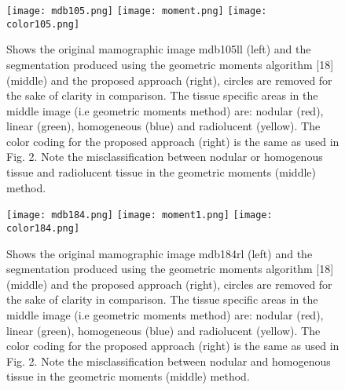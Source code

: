 \documentclass{article}
\begin{document}
\begin{figure}[!htb]
	\centering
	\texttt{[image: mdb105.png]}\hfil
	\texttt{[image: moment.png]}\hfil
	\texttt{[image: color105.png]}
	\caption{Shows the original mamographic image mdb105ll (left) and the segmentation produced using the geometric moments algorithm [18](middle) and the proposed approach (right), circles are removed for the sake of clarity in comparison. The tissue specific areas in the middle image (i.e geometric moments method) are: nodular (red), linear (green), homogeneous (blue) and radiolucent (yellow). The color coding for the proposed approach (right) is the same as used in Fig. 2. Note the misclassification between nodular or homogenous tissue and radiolucent tissue in the geometric moments (middle) method. } 
	
\end{figure}
\newpage
\begin{figure}[h!b]
	\centering
	\texttt{[image: mdb184.png]}\hfil
	\texttt{[image: moment1.png]}\hfil
	\texttt{[image: color184.png]}
	\caption{Shows the original mamographic image mdb184rl (left) and the segmentation produced using the geometric moments algorithm [18](middle) and the proposed approach (right), circles are removed for the sake of clarity in comparison. The tissue specific areas in the middle image (i.e geometric moments method) are: nodular (red), linear (green), homogeneous (blue) and radiolucent (yellow). The color coding for the proposed approach (right) is the same as used in Fig. 2. Note the misclassification between nodular and homogenous tissue in the geometric moments (middle) method. } 
	\label{fig:figure6}
\end{figure}
\end{document}
